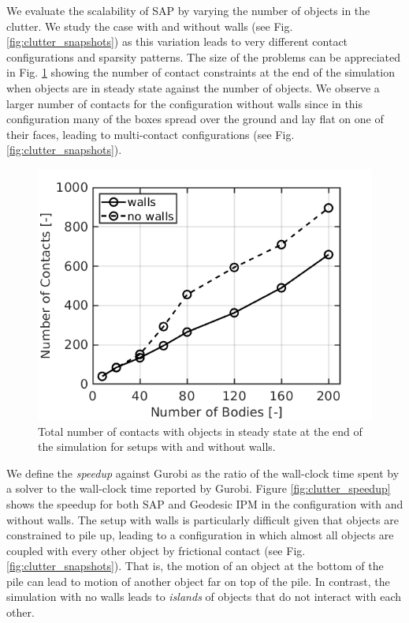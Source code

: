 We evaluate the scalability of SAP by varying the
number of objects in the clutter. We
study the case with and without walls (see
Fig. \ref{fig:clutter_snapshots}) as this variation leads to very
different contact configurations and sparsity patterns. The size of the problems can be
appreciated in Fig. \ref{fig:clutter_num_contats} showing the number of contact
constraints at the end of the simulation when objects are in steady state
against the number of objects. We observe a larger number of contacts for the
configuration without walls since in this configuration many of the boxes spread
over the ground and lay flat on one of their faces, leading to multi-contact
configurations (see Fig. \ref{fig:clutter_snapshots}).
\begin{figure}[!h]
	\centering
	\includegraphics[width=0.7\columnwidth]{figures/clutter/number_of_contacts.png}
	\caption{\label{fig:clutter_num_contats} 
	Total number of contacts with objects in steady state at the end of the
	simulation for setups with and without walls.}
\end{figure}

We define the \emph{speedup} against Gurobi as the ratio of the wall-clock time spent by a solver to the wall-clock time reported by Gurobi. Figure \ref{fig:clutter_speedup} shows the speedup for both
SAP and Geodesic IPM in the configuration with and without walls.
The setup with walls is particularly difficult given that objects are
constrained to pile up, leading to a configuration in which almost all objects
are coupled with every other object by frictional contact
(see Fig. \ref{fig:clutter_snapshots}). That is, the motion of an object at the
bottom of the pile can lead to motion of another object far on top of the pile.
In contrast, the simulation with no walls leads to \emph{islands} of objects
that do not interact with each other.


